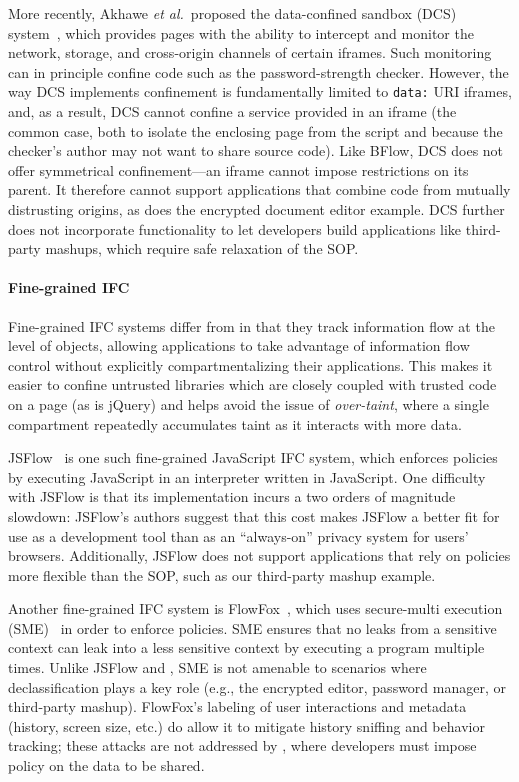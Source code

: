 More recently, Akhawe \emph{et al.}~proposed the data-confined
sandbox (DCS) system~\cite{Akhawe2013}, which provides pages with the
ability to intercept and monitor the network, storage, and cross-origin
channels of certain iframes.
%
Such monitoring can in principle confine code such as the
password-strength checker.
%
However, the way DCS implements confinement is fundamentally limited to \verb|data:|
URI iframes, and, as a result, DCS cannot confine a service provided
in an iframe (the common case, both to isolate the enclosing page from
the script and because the checker's author may not want to share
source code\cite{postman}).
%
Like BFlow, DCS does not offer symmetrical confinement---an iframe
cannot impose restrictions on its parent. It therefore cannot support
applications that combine code from mutually distrusting origins, as
does the encrypted document editor example.
%
DCS further does not incorporate functionality to let developers build
applications like third-party mashups, which require safe relaxation of the
SOP\@.

\paragraph{Fine-grained IFC}
Fine-grained IFC systems differ from \sys{} in that they track
information flow at the level of objects, allowing applications
to take advantage of information flow control without explicitly
compartmentalizing their applications. This makes it easier to
confine untrusted libraries which are closely coupled with trusted
code on a page (as is jQuery) and helps avoid the issue of \emph{over-taint},
where a single compartment repeatedly accumulates taint as it interacts
with more data.

JSFlow~\cite{JSFlow} is one such fine-grained JavaScript IFC system, which
enforces policies by executing JavaScript in an interpreter written in
JavaScript.
%
One difficulty with JSFlow is that
its implementation incurs a two orders of magnitude slowdown:
JSFlow's authors suggest that this cost makes JSFlow a better fit for use as a development tool than
as an ``always-on'' privacy system for users' browsers.
%
Additionally, JSFlow does not support applications that rely on policies
more flexible than the SOP, such as our third-party mashup example.

Another fine-grained IFC system is FlowFox~\cite{DeGroef:2012},
which uses secure-multi execution
(SME)~\cite{Devriese:2010} in order to enforce policies. SME ensures that no leaks
from a sensitive context can leak into a less sensitive context by
executing a program multiple times.
%
Unlike JSFlow and \sys{}, SME is not amenable to
scenarios where declassification plays a key role (e.g., the encrypted
editor, password manager, or third-party mashup).
%
FlowFox's labeling of user interactions and metadata (history, screen
size, etc.) do allow it to mitigate history sniffing and behavior
tracking;
these attacks are not addressed by \sys{}, where developers must
impose policy on the data to be shared.

